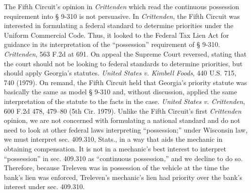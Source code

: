 The Fifth Circuit's opinion in \textit{Crittenden} which read the continuous
possession requirement into {\S} 9-310 is not persuasive. In
\textit{Crittenden}, the Fifth Circuit was interested in formulating a federal
standard to determine priorities under the Uniform Commercial Code. Thus, it
looked to the Federal Tax Lien Act for guidance in its interpretation of the
``possession'' requirement of {\S} 9-310. \textit{Crittenden}, 563 F.2d at
691. On appeal the Supreme Court reversed, stating that the court should not be
looking to federal standards to determine priorities, but should apply
Georgia's statutes. \textit{United States v. Kimbell Foods}, 440 U.S. 715, 740
(1979). On remand, the Fifth Circuit held that Georgia's priority statute was
basically the same as model {\S} 9-310 and, without discussion, applied the
same interpretation of the statute to the facts in the case. \textit{United
States v. Crittenden}, 600 F.2d 478, 479--80 (5th Cir. 1979). Unlike the Fifth
Circuit's first \textit{Crittenden} opinion, we are not concerned with
formulating a national standard and do not need to look at other federal laws
interpreting ``possession;'' under Wisconsin law, we must interpret sec.
409.310, Stats., in a way that aids the mechanic in obtaining compensation. It
is not in a mechanic's best interest to interpret ``possession'' in sec.
409.310 as ``continuous possession,'' and we decline to do so. Therefore,
because Treleven was in possession of the vehicle at the time the bank's lien
was enforced, Treleven's mechanic's lien had priority over the bank's interest
under sec. 409.310.

